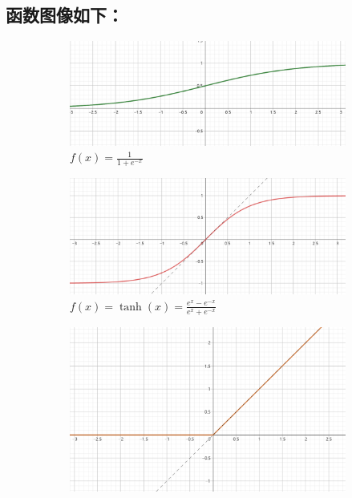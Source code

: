 \documentclass[8pt]{article}
\begin{document}
\subsection*{函数图像如下：}
\begin{figure}[H]
    \centering
    \begin{subfigure}{0.32\textwidth}
        \centering
        \includegraphics[width=\textwidth]{../Prob3/img/f1.png}
        \caption{$f(x) = \frac{1}{1 + e^{-x}}$}
        \label{fig:sigmoid}
    \end{subfigure}
    \hfill
    \begin{subfigure}{0.32\textwidth}
        \centering
        \includegraphics[width=\textwidth]{../Prob3/img/f2.png}
        \caption{$f(x) = \tanh(x) = \frac{e^x - e^{-x}}{e^x + e^{-x}}$}
        \label{fig:tanh}
    \end{subfigure}
    \hfill
    \begin{subfigure}{0.32\textwidth}
        \centering
        \includegraphics[width=\textwidth]{../Prob3/img/f3.png}

\end{subfigure}
\end{figure}
\end{document}
